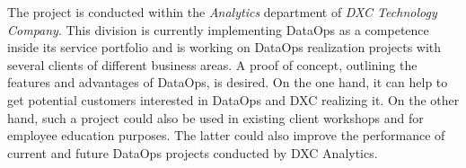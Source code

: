 The project is conducted within the \textit{Analytics} department of \textit{DXC Technology Company}. This division is currently implementing DataOps as a competence inside its service portfolio and is working on DataOps realization projects with several clients of different business areas. A proof of concept, outlining the features and advantages of DataOps, is desired. On the one hand, it can help to get potential customers interested in DataOps and DXC realizing it. On the other hand, such a project could also be used in existing client workshops and for employee education purposes. The latter could also improve the performance of current and future DataOps projects conducted by DXC Analytics.